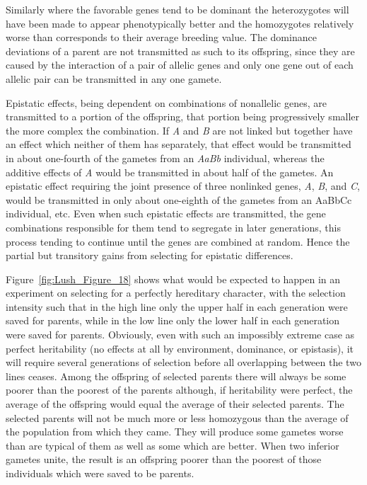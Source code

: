 Similarly where the favorable genes tend to be dominant the heterozygotes
will have been made to appear phenotypically better and the
homozygotes relatively worse than corresponds to their average breeding
value. The dominance deviations of a parent are not transmitted as
such to its offspring, since they are caused by the interaction of a pair
of allelic genes and only one gene out of each allelic pair can be transmitted
in any one gamete.

Epistatic effects, being dependent on combinations of nonallelic
genes, are transmitted to a portion of the offspring, that portion being
progressively smaller the more complex the combination. If \textit{A} and \textit{B}
are not linked but together have an effect which neither of them has
separately, that effect would be transmitted in about one-fourth of the
gametes from an \textit{AaBb} individual, whereas the additive effects of \textit{A}
would be transmitted in about half of the gametes. An epistatic effect
requiring the joint presence of three nonlinked genes, \textit{A}, \textit{B}, and \textit{C},
would be transmitted in only about one-eighth of the gametes from an
AaBbCc individual, etc. Even when such epistatic effects are transmitted,
the gene combinations responsible for them tend to segregate in
later generations, this process tending to continue until the genes are
combined at random. Hence the partial but transitory gains from selecting
for epistatic differences.

Figure~\ref{fig:Lush_Figure_18} shows what would be expected to happen in an experiment
on selecting for a perfectly hereditary character, with the selection
intensity such that in the high line only the upper half in each generation
were saved for parents, while in the low line only the lower half in
each generation were saved for parents. Obviously, even with such an
impossibly extreme case as perfect heritability (no effects at all by
environment, dominance, or epistasis), it will require several generations of
selection before all overlapping between the two lines ceases. Among
the offspring of selected parents there will always be some poorer than
the poorest of the parents although, if heritability were perfect, the
average of the offspring would equal the average of their selected
parents. The selected parents will not be much more or less homozygous
than the average of the population from which they came. They will
produce some gametes worse than are typical of them as well as some
which are better. When two inferior gametes unite, the result is an offspring
poorer than the poorest of those individuals which were saved to
be parents.


